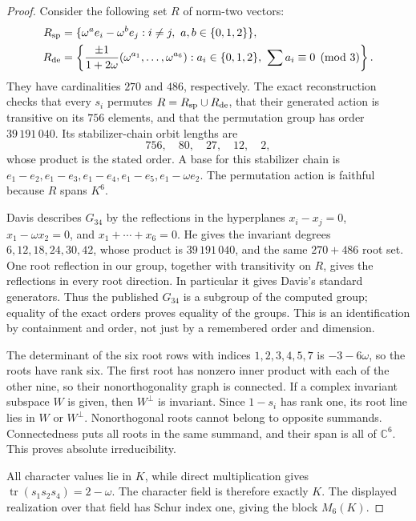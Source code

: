 \documentclass[11pt]{article}
\theoremstyle{definition}
\theoremstyle{remark}
\begin{document}
\begin{proof}
Consider the following set \(R\) of norm-two vectors:
\[
\begin{split}
 R_{\rm sp}&=\{\omega^ae_i-\omega^be_j:
          i\ne j,\ a,b\in\{0,1,2\}\},\\
 R_{\rm de}&=\left\{\frac{\pm1}{1+2\omega}
       (\omega^{a_1},\ldots,\omega^{a_6}):
       a_i\in\{0,1,2\},\ \sum a_i\equiv0\pmod3\right\}.
\end{split}
\]
They have cardinalities \(270\) and \(486\), respectively.  The exact
reconstruction checks that every \(s_i\) permutes \(R=R_{\rm sp}\cup R_{\rm de}\),
that their generated action is transitive on its \(756\) elements, and that
the permutation group has order \(39\,191\,040\).  Its stabilizer-chain
orbit lengths are
\[
                   756,\quad80,\quad27,\quad12,\quad2,
\]
whose product is the stated order.  A base for this stabilizer chain is
$e_1-e_2,e_1-e_3,e_1-e_4,e_1-e_5,e_1-\omega e_2$.
The permutation action is faithful because
\(R\) spans \(K^6\).

Davis \cite[Theorem 5.1 and its proof, pp.~312--313]{Davis08} describes
\(G_{34}\) by the reflections in the hyperplanes
\(x_i-x_j=0\), \(x_1-\omega x_2=0\), and
\(x_1+\cdots+x_6=0\).  He gives the invariant degrees
\(6,12,18,24,30,42\), whose product is \(39\,191\,040\), and the same
\(270+486\) root set.  One root reflection in our group, together with
transitivity on \(R\), gives the reflections in every root direction.  In
particular it gives Davis's standard generators.  Thus the published
\(G_{34}\) is a subgroup of the computed group; equality of the exact orders
proves equality of the groups.  This is an identification by containment and
order, not just by a remembered order and dimension.

The determinant of the six root rows with indices $1,2,3,4,5,7$ is
$-3-6\omega$, so the roots have rank six.  The first root has nonzero
inner product with each of the other nine, so their nonorthogonality
graph is connected.  If a complex invariant subspace \(W\) is given, then
\(W^\perp\) is invariant.  Since \(1-s_i\) has rank one, its root line
lies in \(W\) or \(W^\perp\).  Nonorthogonal roots cannot belong to opposite
summands.  Connectedness puts all roots in the same summand, and their span
is all of \(\mathbb C^6\).  This proves absolute irreducibility.

All character values lie in $K$, while direct multiplication gives
$\operatorname{tr}(s_1s_2s_4)=2-\omega$.  The character field is therefore
exactly $K$.  The displayed realization
over that field has Schur index one, giving the block \(M_6(K)\).
\end{proof}
\end{document}
